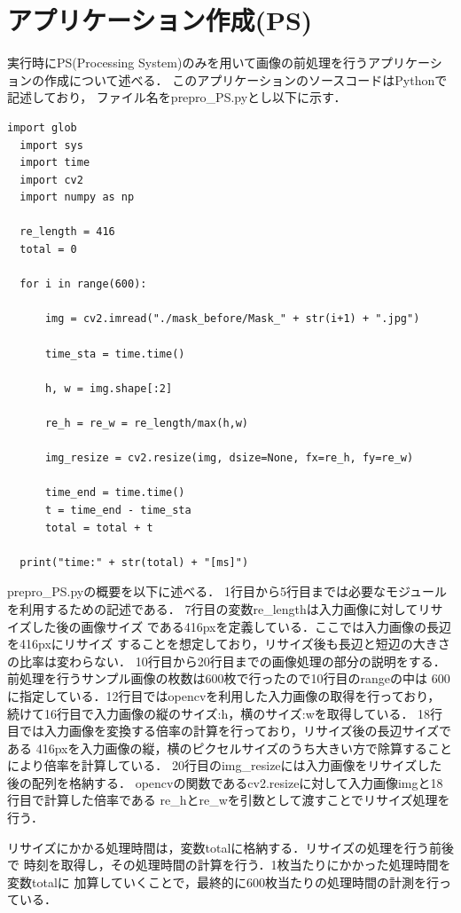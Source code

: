 \documentclass[11pt,a4j]{jreport}
\begin{document}
\section{アプリケーション作成(PS)}
実行時にPS(Processing System)のみを用いて画像の前処理を行うアプリケーションの作成について述べる．
このアプリケーションのソースコードはPythonで記述しており，
ファイル名をprepro_PS.pyとし以下に示す．
\begin{lstlisting}[caption=prepro_PS.py]
  import glob
  import sys
  import time
  import cv2
  import numpy as np
  
  re_length = 416
  total = 0
  
  for i in range(600):
  
      img = cv2.imread("./mask_before/Mask_" + str(i+1) + ".jpg")
  
      time_sta = time.time()
  
      h, w = img.shape[:2]
  
      re_h = re_w = re_length/max(h,w)
  
      img_resize = cv2.resize(img, dsize=None, fx=re_h, fy=re_w)
  
      time_end = time.time()
      t = time_end - time_sta
      total = total + t
  
  print("time:" + str(total) + "[ms]")
\end{lstlisting}
prepro_PS.pyの概要を以下に述べる．
1行目から5行目までは必要なモジュールを利用するための記述である．
7行目の変数re_lengthは入力画像に対してリサイズした後の画像サイズ
である416pxを定義している．ここでは入力画像の長辺を416pxにリサイズ
することを想定しており，リサイズ後も長辺と短辺の大きさの比率は変わらない．
10行目から20行目までの画像処理の部分の説明をする．
前処理を行うサンプル画像の枚数は600枚で行ったので10行目のrangeの中は
600に指定している．12行目ではopencvを利用した入力画像の取得を行っており，
続けて16行目で入力画像の縦のサイズ:h，横のサイズ:wを取得している．
18行目では入力画像を変換する倍率の計算を行っており，リサイズ後の長辺サイズである
416pxを入力画像の縦，横のピクセルサイズのうち大きい方で除算することにより倍率を計算している．
20行目のimg_resizeには入力画像をリサイズした後の配列を格納する．
opencvの関数であるcv2.resizeに対して入力画像imgと18行目で計算した倍率である
re_hとre_wを引数として渡すことでリサイズ処理を行う．

リサイズにかかる処理時間は，変数totalに格納する．リサイズの処理を行う前後で
時刻を取得し，その処理時間の計算を行う．1枚当たりにかかった処理時間を変数totalに
加算していくことで，最終的に600枚当たりの処理時間の計測を行っている．
\end{document}
